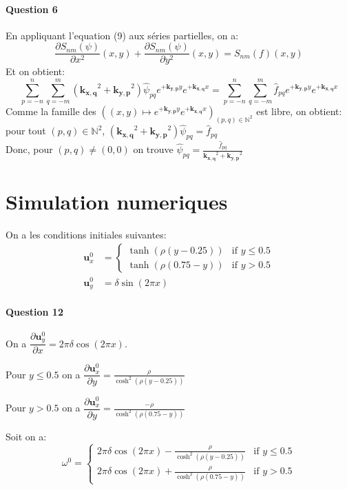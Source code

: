 \documentclass{article}
\newcommand{\pd}[2]{\dfrac{\partial#1}{\partial#2}}
\newcommand{\complex}[1]{\bm{#1}}
\newcommand{\kxq}{\complex{k_{x,q}}}
\newcommand{\kyp}{\complex{k_{y,p}}}
\begin{document}
\paragraph{Question 6}
En appliquant l'equation (9) aux séries partielles, on a:
\begin{equation}
	\pd{S_{nm}(\psi)}{x^2}(x,y)
    + 
	\pd{S_{nm}(\psi)}{y^2}(x,y)
	= S_{nm}(f)(x,y)
    \label{eq:poisson}
\end{equation}
Et on obtient:
\begin{equation*}
    \sum_{p=-n}^{n} \sum_{q=-m}^{m} (\kxq^2 + \kyp^2) \hat{\psi}_{pq} e^{+\kyp y} e^{+\kxq x}
	=
		\sum_{p=-n}^{n} \sum_{q=-m}^{m}\hat{f}_{pq} e^{+\kyp y} e^{+\kxq x}
\end{equation*}
Comme la famille des \(((x, y)\mapsto e^{+\kyp y} e^{+\kxq x})_{(p,q)\in\mathbb N^2}\)
est libre, on obtient: pour tout \((p,q)\in\mathbb N^2\), \((\kxq^2 + \kyp^2) \hat{\psi}_{pq} = \hat{f}_{pq}\)
\\
Donc, pour \((p,q)\neq(0,0)\) on trouve \(\hat{\psi}_{pq} = \frac{\hat{f}_{pq}}{\kxq^2 + \kyp^2}\)

\section{Simulation numeriques}

On a les conditions initiales suivantes:
\begin{align*}
	\mathbf{u}_x^0 &= \begin{cases}
		\tanh\left(\rho(y-0.25)\right) & \text{if }y\leq 0.5 \\
		\tanh\left(\rho(0.75-y)\right) & \text{if }y > 0.5
	\end{cases} \\
	\mathbf{u}_y^0 &= \delta\sin(2\pi x)
\end{align*}

\paragraph{Question 12}
On a $\pd{\mathbf{u}_y^0}{x}=2\pi\delta\cos(2\pi x)$.

Pour $y \leq 0.5$ on a $\pd{\mathbf{u}_x^0}{y}=\frac{\rho}{\cosh^2(\rho(y-0.25))}$

Pour $y > 0.5$ on a $\pd{\mathbf{u}_x^0}{y}=\frac{-\rho}{\cosh^2(\rho(0.75-y))}$


Soit on a:
\begin{equation*}
	\omega^0 =
	\begin{cases}
		2\pi\delta\cos(2\pi x) - \frac{\rho}{\cosh^2(\rho(y-0.25))} & \text{if }y\leq 0.5 \\
		2\pi\delta\cos(2\pi x) + \frac{\rho}{\cosh^2(\rho(0.75-y))}  & \text{if }y > 0.5
	\end{cases}
\end{equation*}

\begin{appendix}
  \listoffigures
\end{appendix}
\end{document}
